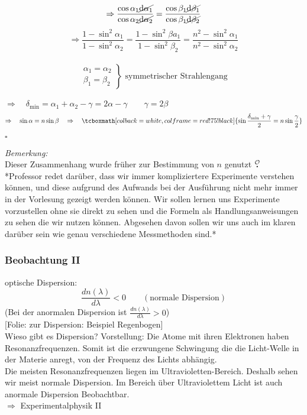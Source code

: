 \documentclass[titlepage,11pt,a4paper,ngerman]{report}
\newcommand{\tx}[1]{\textrm{#1}}
\newcommand{\folie}[1]{\color{gray}[Folie: #1]\color{black}}
\newcommand{\lcom}[1]{\color{MidnightBlue}#1\color{black}}
\newcommand{\mau}{$\buildrel \mathcal{O} \over{\textbf{.}}$}
\newcommand{\rmbox}[1]{\tcboxmath[colback=white,colframe=red!75!black]{#1}}
\begin{document}
$$\Rightarrow\frac{\cos\alpha_1\cancel{\tx{d}\alpha_1}}{\cos\alpha_2\cancel{\tx{d}\alpha_2}}=\frac{\cos\beta_1\cancel{\tx{d}\beta_1}}{\cos\beta_1\cancel{\tx{d}\beta_2}}$$
$$\Rightarrow\frac{1-\sin^2\alpha_1}{1-\sin^2\alpha_2}=\frac{1-\sin^2\beta  a_1}{1-\sin^2\beta_2}=\frac{n^2-\sin^2\alpha_1}{n^2-\sin^2\alpha_2}$$\\[-10pt]
$$\left.\begin{array}{c}
\alpha_1=\alpha_2 \\
\beta_1=\beta_2\end{array} \right\} \textrm{ symmetrischer Strahlengang}$$\\
\noindent
$ \Rightarrow \quad \delta_{\tx{min}} = \alpha_1 + \alpha_2 - \gamma = 2 \alpha - \gamma \qquad \gamma = 2 \beta $
\begin{equation*}
\Rightarrow \quad \sin \alpha = n \sin \beta \quad \Rightarrow \quad \rmbox{\sin \frac{\delta_{\tx{min}} + \gamma}{2} = n \sin \frac{\gamma}{2}}
\end{equation*}
\begin{flushright}
	$ \square $
\end{flushright}
\emph{Bemerkung:}\\
Dieser Zusammenhang wurde früher zur Bestimmung von $ n $ genutzt \mau\\
\lcom{*Professor redet darüber, dass wir immer kompliziertere Experimente verstehen können, und diese aufgrund des Aufwands bei der Ausführung nicht mehr immer in der Vorlesung gezeigt werden können. Wir sollen lernen uns Experimente vorzustellen ohne sie direkt zu sehen und die Formeln als Handlungsanweisungen zu sehen die wir nutzen können. Abgesehen davon sollen wir uns auch im klaren darüber sein wie genau verschiedene Messmethoden sind.*}

\subsubsection{Beobachtung II}
optische Dispersion:
\begin{equation*}
\frac{dn(\lambda)}{d\lambda} < 0 \qquad (\tx{normale Dispersion})
\end{equation*}
(Bei der anormalen Dispersion ist $ \frac{d n(\lambda)}{d\lambda} > 0 $)\\
\folie{zur Dispersion: Beispiel Regenbogen}\\[5pt]
\lcom{Wieso gibt es Dispersion? Vorstellung: Die Atome mit ihren Elektronen haben Resonanzfrequenzen. Somit ist die erzwungene Schwingung die die Licht-Welle in der Materie anregt, von der Frequenz des Lichts abhängig.\\
Die meisten Resonanzfrequenzen liegen im Ultravioletten-Bereich. Deshalb sehen wir meist normale Dispersion. Im Bereich über Ultraviolettem Licht ist auch anormale Dispersion Beobachtbar.}\\[5pt]
$ \Rightarrow $ Experimentalphysik II
\end{document}
